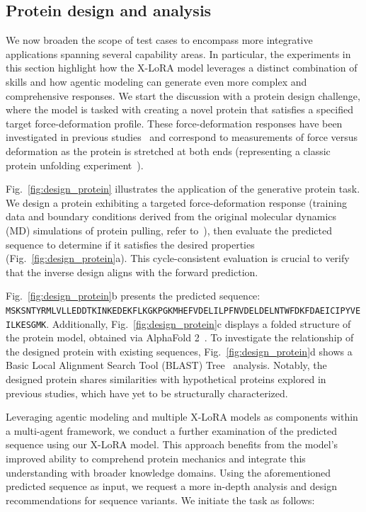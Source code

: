 \subsection{Protein design and analysis}

We now broaden the scope of test cases to encompass more integrative applications spanning several capability areas. In particular, the experiments in this section highlight how the X-LoRA model leverages a distinct combination of skills and how agentic modeling can generate even more complex and comprehensive responses. We start the discussion with a protein design challenge, where the model is tasked with creating a novel protein that satisfies a specified target force-deformation profile. These force-deformation responses have been investigated in previous studies~\cite{Ni2023ForceGen:Model} and correspond to measurements of force versus deformation as the protein is stretched at both ends (representing a classic protein unfolding experiment~\cite{Lu1998UnfoldingSimulation.}).

Fig.~\ref{fig:design_protein} illustrates the application of the generative protein task. We design a protein exhibiting a targeted force-deformation response (training data and boundary conditions derived from the original molecular dynamics (MD) simulations of protein pulling, refer to~\cite{Ni2023ForceGen:Model}), then evaluate the predicted sequence to determine if it satisfies the desired properties (Fig.~\ref{fig:design_protein}a). This cycle-consistent evaluation is crucial to verify that the inverse design aligns with the forward prediction.

Fig.~\ref{fig:design_protein}b presents the predicted sequence: \texttt{MSKSNTYRMLVLLEDDTKINKEDEKFLKGKPGKMHEFVDELILPFNVDELDELNTWFDKFDAEICIPYVEILKESGMK}. Additionally, Fig.~\ref{fig:design_protein}c displays a folded structure of the protein model, obtained via AlphaFold 2~\cite{Jumper2021HighlyAlphaFoldb}. To investigate the relationship of the designed protein with existing sequences, Fig.~\ref{fig:design_protein}d shows a Basic Local Alignment Search Tool (BLAST) Tree~\cite{Altschul1990BasicTool} analysis. Notably, the designed protein shares similarities with hypothetical proteins explored in previous studies, which have yet to be structurally characterized.

Leveraging agentic modeling and multiple X-LoRA models as components within a multi-agent framework, we conduct a further examination of the predicted sequence using our X-LoRA model. This approach benefits from the model’s improved ability to comprehend protein mechanics and integrate this understanding with broader knowledge domains. Using the aforementioned predicted sequence as input, we request a more in-depth analysis and design recommendations for sequence variants. We initiate the task as follows:


